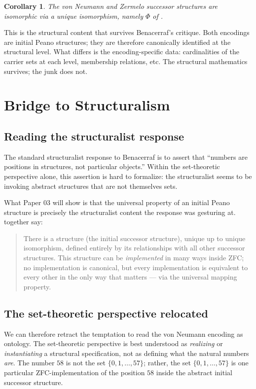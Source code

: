 \documentclass[12pt]{article}
\newtheorem{corollary}[theorem]{Corollary}
\theoremstyle{definition}
\theoremstyle{remark}
\begin{document}
\begin{corollary}\label{cor:vN-Z-iso}
The von Neumann and Zermelo successor structures are isomorphic via a unique
isomorphism, namely $\Phi$ of .
\end{corollary}

This is the structural content that survives Benacerraf's critique. Both
encodings are initial Peano structures; they are therefore canonically
identified at the structural level. What differs is the
encoding-specific data: cardinalities of the carrier sets at each level,
membership relations, etc. The structural mathematics survives; the
junk does not.

\section{Bridge to Structuralism}
\label{sec:bridge}

\subsection{Reading the structuralist response}

The standard structuralist response to Benacerraf is to assert that
``numbers are positions in structures, not particular objects.'' Within
the set-theoretic perspective alone, this assertion is hard to formalize:
the structuralist seems to be invoking abstract structures that are not
themselves sets.

What Paper 03 will show is that the universal property of an initial
Peano structure is precisely the structuralist content the response was
gesturing at.  together say:

\begin{quote}
There is a structure (the initial successor structure), unique up to unique
isomorphism, defined entirely by its relationships with all other successor
structures. This structure can be \emph{implemented} in many ways inside
ZFC; no implementation is canonical, but every implementation is
equivalent to every other in the only way that matters --- via the
universal mapping property.
\end{quote}

\subsection{The set-theoretic perspective relocated}

We can therefore retract the temptation to read the von Neumann encoding
as ontology. The set-theoretic perspective is best understood as
\emph{realizing} or \emph{instantiating} a structural specification, not
as defining what the natural numbers \emph{are}. The number $58$ is not
the set $\{0,1,\ldots,57\}$; rather, the set $\{0,1,\ldots,57\}$ is one
particular ZFC-implementation of the position $58$ inside the abstract
initial successor structure.
\end{document}
